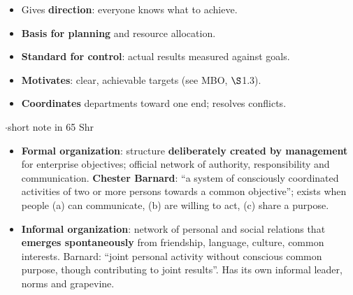 
{\color{sub}\footnotesize {} }
\begin{itemize}
  \item Gives \textbf{direction}: everyone knows what to achieve.
  \item \textbf{Basis for planning} and resource allocation.
  \item \textbf{Standard for control}: actual results measured against goals.
  \item \textbf{Motivates}: clear, achievable targets (see MBO, $\S$1.3).
  \item \textbf{Coordinates} departments toward one end; resolves conflicts.
\end{itemize}

{\color{sub}\footnotesize {}  \gap$\cdot$\gap short note in 65 Shr}

\begin{itemize}
  \item \textbf{Formal organization}: structure \textbf{deliberately created by management}
    for enterprise objectives; official network of authority, responsibility and
    communication. \textbf{Chester Barnard}: ``a system of consciously coordinated activities of
    two or more persons towards a common objective''; exists when people (a) can communicate,
    (b) are willing to act, (c) share a purpose.
  \item \textbf{Informal organization}: network of personal and social relations that
    \textbf{emerges spontaneously} from friendship, language, culture, common interests.
    Barnard: ``joint personal activity without conscious common purpose, though contributing
    to joint results''. Has its own informal leader, norms and grapevine.
\end{itemize}

